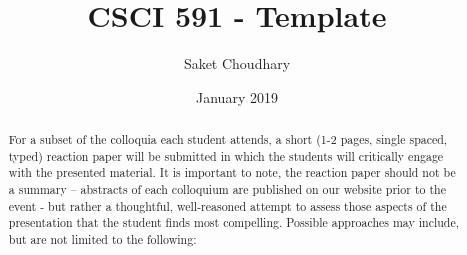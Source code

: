 \documentclass{article}
\title{CSCI 591 - Template}
\author{Saket Choudhary}
\date{January 2019}
\begin{document}
\maketitle

\begin{abstract}
   For a subset of the colloquia each student attends, a short (1-2
   pages, single spaced, typed) reaction paper will be submitted in 
   which the students will critically engage with the presented 
   material. It is important to note, the reaction paper should not be a 
   summary – abstracts of each colloquium are published on our website
   prior to the event - but rather a thoughtful, well-reasoned attempt to
   assess those aspects of the presentation that the student finds most 
   compelling. Possible approaches may include, but are not limited to
   the following:
\end{abstract}
\end{document}
